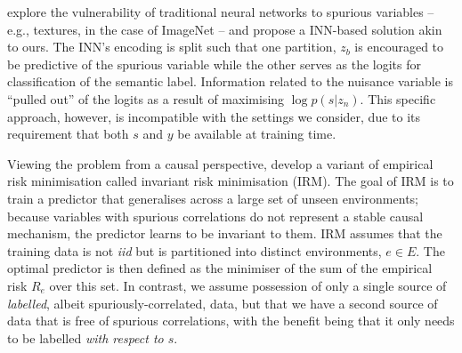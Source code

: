 \citet{JacBehZemBet19} explore the vulnerability of traditional neural networks to spurious
variables -- e.g., textures, in the case of ImageNet \citep{Geir18} -- and propose a INN-based
solution akin to ours. The INN's encoding is split such that one partition, $z_b$ is encouraged to
be predictive of the spurious variable while the other serves as the logits for classification of
the semantic label. Information related to the nuisance variable is ``pulled out'' of the logits as
a result of maximising $\log p(s|z_n)$. This specific approach, however, is incompatible with the
settings we consider, due to its requirement that both $s$ and $y$ be available at training time.

Viewing the problem from a causal perspective, \citet{arjovsky2019invariant} develop a variant of
empirical risk minimisation called invariant risk minimisation (IRM). The goal of IRM is to train a
predictor that generalises across a large set of unseen environments; because variables with
spurious correlations do not represent a stable causal mechanism, the predictor learns to be
invariant to them. IRM assumes that the training data is not \emph{iid} but is partitioned into
distinct environments, $e \in E$. The optimal predictor is then defined as the minimiser of the sum
of the empirical risk $R_e$ over this set. In contrast, we assume possession of only a single
source of \emph{labelled}, albeit spuriously-correlated, data, but that we have a second source of
data that is free of spurious correlations, with the benefit being that it only needs to be
labelled \emph{with respect to $s$}.


